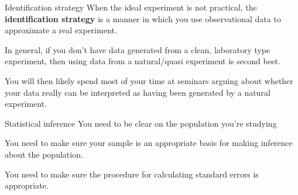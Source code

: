 \documentclass[handout]{beamer}
\begin{document}
\begin{frame}{Identification strategy}
When the ideal experiment is not practical, the \textbf{identification strategy} is a manner in which you use observational data to approximate a real experiment. \bigskip

In general, if you don't have data generated from a clean, laboratory type experiment, then using data
from a natural/quasi experiment is second best.\bigskip

You will then likely spend most of your time at seminars arguing about whether your data really can be interpreted as having been generated by a natural experiment.
\end{frame}

\begin{frame}{Statistical inference}
You need to be clear on the population you're studying \bigskip

You need to make sure your sample is an appropriate basis for making inference about the population.\bigskip

You need to make sure the procedure for calculating standard errors is appropriate.

\end{frame}
\end{document}
